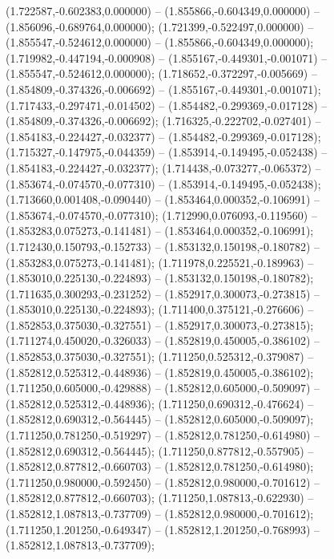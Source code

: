  (1.722587,-0.602383,0.000000) -- (1.855866,-0.604349,0.000000) -- (1.856096,-0.689764,0.000000);
 (1.721399,-0.522497,0.000000) -- (1.855547,-0.524612,0.000000) -- (1.855866,-0.604349,0.000000);
 (1.719982,-0.447194,-0.000908) -- (1.855167,-0.449301,-0.001071) -- (1.855547,-0.524612,0.000000);
 (1.718652,-0.372297,-0.005669) -- (1.854809,-0.374326,-0.006692) -- (1.855167,-0.449301,-0.001071);
 (1.717433,-0.297471,-0.014502) -- (1.854482,-0.299369,-0.017128) -- (1.854809,-0.374326,-0.006692);
 (1.716325,-0.222702,-0.027401) -- (1.854183,-0.224427,-0.032377) -- (1.854482,-0.299369,-0.017128);
 (1.715327,-0.147975,-0.044359) -- (1.853914,-0.149495,-0.052438) -- (1.854183,-0.224427,-0.032377);
 (1.714438,-0.073277,-0.065372) -- (1.853674,-0.074570,-0.077310) -- (1.853914,-0.149495,-0.052438);
 (1.713660,0.001408,-0.090440) -- (1.853464,0.000352,-0.106991) -- (1.853674,-0.074570,-0.077310);
 (1.712990,0.076093,-0.119560) -- (1.853283,0.075273,-0.141481) -- (1.853464,0.000352,-0.106991);
 (1.712430,0.150793,-0.152733) -- (1.853132,0.150198,-0.180782) -- (1.853283,0.075273,-0.141481);
 (1.711978,0.225521,-0.189963) -- (1.853010,0.225130,-0.224893) -- (1.853132,0.150198,-0.180782);
 (1.711635,0.300293,-0.231252) -- (1.852917,0.300073,-0.273815) -- (1.853010,0.225130,-0.224893);
 (1.711400,0.375121,-0.276606) -- (1.852853,0.375030,-0.327551) -- (1.852917,0.300073,-0.273815);
 (1.711274,0.450020,-0.326033) -- (1.852819,0.450005,-0.386102) -- (1.852853,0.375030,-0.327551);
 (1.711250,0.525312,-0.379087) -- (1.852812,0.525312,-0.448936) -- (1.852819,0.450005,-0.386102);
 (1.711250,0.605000,-0.429888) -- (1.852812,0.605000,-0.509097) -- (1.852812,0.525312,-0.448936);
 (1.711250,0.690312,-0.476624) -- (1.852812,0.690312,-0.564445) -- (1.852812,0.605000,-0.509097);
 (1.711250,0.781250,-0.519297) -- (1.852812,0.781250,-0.614980) -- (1.852812,0.690312,-0.564445);
 (1.711250,0.877812,-0.557905) -- (1.852812,0.877812,-0.660703) -- (1.852812,0.781250,-0.614980);
 (1.711250,0.980000,-0.592450) -- (1.852812,0.980000,-0.701612) -- (1.852812,0.877812,-0.660703);
 (1.711250,1.087813,-0.622930) -- (1.852812,1.087813,-0.737709) -- (1.852812,0.980000,-0.701612);
 (1.711250,1.201250,-0.649347) -- (1.852812,1.201250,-0.768993) -- (1.852812,1.087813,-0.737709);
